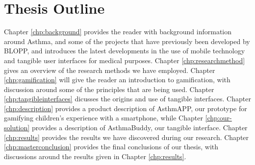 \section{Thesis Outline}
\label{sec:thesisoutline}
Chapter \ref{chp:background} provides the reader with background information around Asthma, and some of the projects that have previously been developed by BLOPP, and introduces the latest developments in the use of mobile technology and tangible user interfaces for medical purposes.
Chapter \ref{chp:researchmethod} gives an overview of the research methods we have employed.  
Chapter \ref{chp:gamification} will give the reader an introduction to gamification, with discussion around some of the principles that are being used. 
Chapter \ref{chp:tangibleinterfaces} dicusses the origins and use of tangible interfaces.
Chapter \ref{chp:description} provides a product description of AsthmAPP, our prototype for gamifying children's experience with a smartphone, while Chapter \ref{chp:our-solution} provides a description of AsthmaBuddy, our tangible interface.
Chapter \ref{chp:results} provides the results we have discovered during our research.
Chapter \ref{chp:masterconclusion} provides the final conclusions of our thesis, with discussions around the results given in Chapter \ref{chp:results}.          
